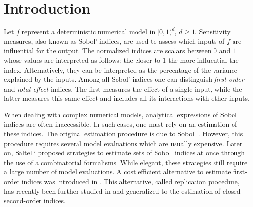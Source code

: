 %
%

\section{Introduction}
\label{sec:1}

Let $f$ represent a deterministic numerical model in $[0,1)^d$, $d \geq 1$. Sensitivity measures, also known as Sobol' indices, are used to assess which inputs of $f$ are influential for the output. The normalized indices are scalars between $0$ and $1$ whose values are interpreted as follows: the closer to $1$ the more influential the index. Alternatively, they can be interpreted as the percentage of the variance explained by the inputs. Among all Sobol' indices one can distinguish \emph{first-order} and \emph{total effect} indices. The first measures the effect of a single input, while the latter measures this same effect and includes all its interactions with other inputs.

When dealing with complex numerical models, analytical expressions of Sobol' indices are often inaccessible. In such cases, one must rely on an estimation of these indices. The original estimation procedure is due to Sobol' \cite{Sobol'}. However, this procedure requires several model evaluations which are usually expensive. Later on, Saltelli \cite{Saltelli} proposed strategies to estimate sets of Sobol' indices at once through the use of a combinatorial formalisms. While elegant, these strategies still require a large number of model evaluations.  A cost efficient alternative to estimate first-order indices was introduced in \cite{Mara}. This alternative, called replication procedure, has recently been further studied  in \cite{Tissot} and generalized to the estimation of closed second-order indices.


